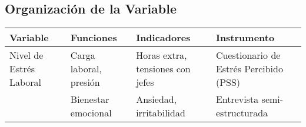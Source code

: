 \documentclass[12pt]{article}
\begin{document}
	\subsection*{Organización de la Variable}
	
	\begin{longtable}{@{}llll@{}}
		\toprule
		\textbf{Variable} & \textbf{Funciones} & \textbf{Indicadores} & \textbf{Instrumento} \\ \midrule
		Nivel de Estrés Laboral & Carga laboral, presión & Horas extra, tensiones con jefes & Cuestionario de Estrés Percibido (PSS) \\
		& Bienestar emocional & Ansiedad, irritabilidad & Entrevista semi-estructurada \\ \bottomrule
	\end{longtable}
	
	
	
	
\end{document}
